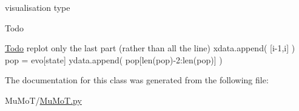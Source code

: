 visualisation type 

\begin{DoxyRefDesc}{Todo}
\item[\hyperlink{todo__todo000070}{Todo}]replot only the last part (rather than all the line) xdata.\+append( \mbox{[}i-\/1,i\mbox{]} ) pop = evo\mbox{[}state\mbox{]} ydata.\+append( pop\mbox{[}len(pop)-\/2\+:len(pop)\mbox{]} ) \end{DoxyRefDesc}


The documentation for this class was generated from the following file\+:\begin{DoxyCompactItemize}
\item 
Mu\+Mo\+T/\hyperlink{_mu_mo_t_8py}{Mu\+Mo\+T.\+py}\end{DoxyCompactItemize}
